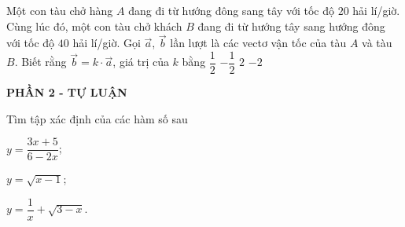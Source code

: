\begin{ex}%
Một con tàu chở hàng $A$ đang đi từ hướng đông sang tây với tốc độ $20$ hải lí/giờ. Cùng lúc đó, một con tàu chở khách $B$ đang đi từ hướng tây sang hướng đông với tốc độ $40$ hải lí/giờ. Gọi $\vec{a}$, $\vec{b}$ lần lượt là các vectơ vận tốc của tàu $A$ và tàu $B$. Biết rằng $\vec{b}=k\cdot\vec{a}$, giá trị của $k$ bằng
	\choice
	{$\dfrac{1}{2}$}
	{$-\dfrac{1}{2}$}
	{$2$}
	{\True $-2$}	
\end{ex}

\begin{center}
	\textbf{PHẦN 2 - TỰ LUẬN}
\end{center}


\begin{bt}%
Tìm tập xác định của các hàm số sau
	\begin{listEX}[3]
		\item $y=\dfrac{3x+5}{6-2x}$;
		\item $y=\sqrt{x-1}$;
		\item $y=\dfrac{1}{x}+\sqrt{3-x}$.
	\end{listEX}
\end{bt}

